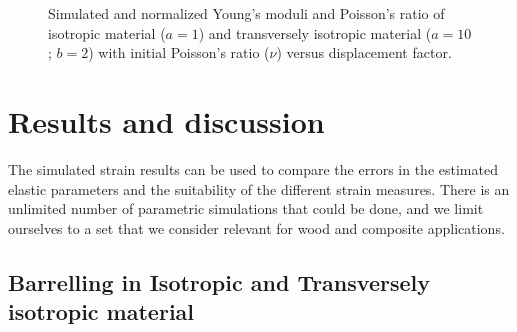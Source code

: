 \documentclass[3p]{elsarticle}
\begin{document}
\begin{center}
\begin{figure}[!ht]


\captionsetup{justification=centering}
\caption{Simulated and normalized Young's moduli and Poisson's ratio of
isotropic material ($a=1$) and transversely isotropic
material ($a=10$; $b=2$) with initial Poisson's ratio ($\nu$) versus
displacement factor.}

\label{fig:isovstriso}
\end{figure}

\end{center}


\color{black}


\section{Results and discussion}
The simulated strain results can be used to compare the errors in the estimated elastic parameters and the suitability of the different strain measures.
There is an unlimited number of parametric simulations that could be done, and we limit ourselves to a set that we consider relevant for wood and composite applications. 



\subsection{ Barrelling in Isotropic and Transversely isotropic material}
\end{document}
